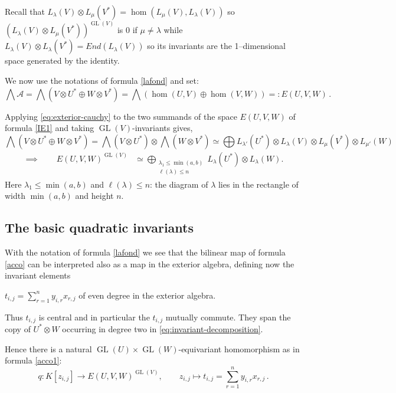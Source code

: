 \documentclass[10pt]{amsart}
\theoremstyle{definition}
\theoremstyle{remark}
\newcommand{\GL}{\operatorname{GL}}
\begin{document}
Recall that  $L_\lambda(V)\otimes L_{\mu}(V^*)=\hom(L_\mu(V),L_\lambda(V))$ so $(L_\lambda(V)\otimes L_{\mu}(V^*))^{\GL(V)}$ is 0 if $\mu\neq \lambda$  while $L_\lambda(V)\otimes L_{\lambda}(V^*)=End(L_\lambda(V) )$  so its invariants are the 1--dimensional space generated by the identity.\medskip

We now use the notations of formula \eqref{lafond} and set:
\begin{equation}\label{IE1}
  \bigwedge \mathcal A= \bigwedge(V\otimes U^*\oplus W\otimes V^*)= \bigwedge(\hom(U,V)\oplus \hom(V,W))=: E(U,V,W)\,.
 \end{equation}

Applying \eqref{eq:exterior-cauchy} to the two summands of the space $E(U,V,W)$ of formula \eqref{IE1} and taking $\GL(V)$-invariants gives, 
$$\bigwedge(V\otimes U^*\oplus W\otimes V^*)=\bigwedge(V\otimes U^*)\otimes \bigwedge(W\otimes V^*)\simeq\bigoplus  L_{\lambda'}(U^*)\otimes L_\lambda(V)\otimes  L_\mu(V^*)\otimes L_{\mu'}(W)  $$
\begin{align}\implies\qquad
E(U,V,W)^{\GL(V)}
&\simeq
\bigoplus_{\substack{\lambda_1\le \min(a,b)\\ \ell(\lambda)\le n}}
L_\lambda(U^*)\otimes L_\lambda(W ).
\label{eq:invariant-decomposition}
\end{align} Here $\lambda_1\leq\min(a,b)$ and $\ell(\lambda)\leq n$: the diagram of $\lambda$ lies in the rectangle of width $\min(a,b)$ and height $n$.


\subsection{The basic quadratic invariants\label{bqi}}With the notation of formula \eqref{lafond} we see that the bilinear map of formula   \eqref{acco} can be interpreted also  as a map in the exterior algebra, defining now the invariant elements  

 $t_{i,j}  =\sum_{r=1}^ny_{i,r}x_{r,j}$ of  even degree in the exterior algebra. \smallskip
 
 Thus  $t_{i,j} $ is central and in particular the $t_{i,j}$ mutually commute.  They span the copy of $U^*\otimes W$ occurring in degree two in \eqref{eq:invariant-decomposition}.  
 
 Hence there is a natural $\GL(U)\times\GL(W)$-equivariant homomorphism as in formula \eqref{acco1}:
\begin{equation}\label{ilq}
q:K[z_{i,j}]\longrightarrow E(U,V,W)^{\GL(V)},
\qquad z_{i,j}\longmapsto t_{i,j}=\sum_{r=1}^ny_{i,r}x_{r,j}\,.
\end{equation}
\end{document}
